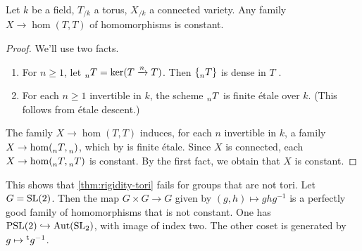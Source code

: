 \begin{theorem}\label{thm:rigidity-tori}
Let $k$ be a field, $T_{/k}$ a torus, $X_{/k}$ a connected variety. Any 
family $X\to \hom(T,T)$ of homomorphisms is constant. 
\end{theorem}
\begin{proof}
We'll use two facts. 
\begin{enumerate}
\item For $n\geqslant 1$, let $\prescript{}{n}{T} = \ker(T\xrightarrow n T)$. Then 
$\{\prescript{}{n}{T}\}$ is dense in $T$ \cite[IX 4.7]{sga3-ii}. 

\item For each $n\geqslant 1$ invertible in $k$, the scheme $\prescript{}{n}{T}$ is 
finite \'etale over $k$. (This follows from \'etale descent.)
\end{enumerate}
The family $X\to \hom(T,T)$ induces, for each $n$ invertible in $k$, a 
family $X\to \hom(\prescript{}{n}{T},\prescript{}{n}{)}$, which by \cite[X 4.2]{sga3-ii} is 
finite \'etale. Since $X$ is connected, each 
$X\to \hom(\prescript{}{n}{T},\prescript{}{n}{T})$ is constant. By the first fact, 
we obtain that $X$ is constant. 
\end{proof}


\begin{example}
This shows that \autoref{thm:rigidity-tori} fails for groups that are not 
tori. Let $G=\operatorname{SL}(2)$. Then the map $G\times G\to G$ given by 
$(g,h)\mapsto g h g^{-1}$ is a perfectly good family of homomorphisms that 
is not constant. One has $\operatorname{PSL}(2)\hookrightarrow\operatorname{Aut}(\operatorname{SL}_2)$, with image of 
index two. The other coset is generated by $g\mapsto \prescript{\mathrm{t}}{}{g}^{-1}$. 
\end{example}










